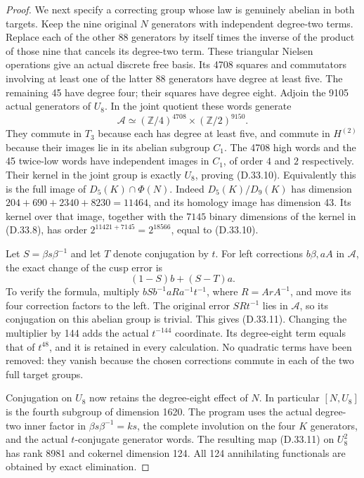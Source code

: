 \begin{proof}
We next specify a correcting group whose law is genuinely abelian in
both targets. Keep the nine original $N$ generators with independent
degree-two terms. Replace each of the other 88 generators by itself
times the inverse of the product of those nine that cancels its
degree-two term. These triangular Nielsen operations give an actual
discrete free basis. Its 4708 squares and commutators involving at least
one of the latter 88 generators have degree at least five. The remaining
45 have degree four; their squares have degree eight. Adjoin the 9105
actual generators of $U_8$. In the joint quotient these words generate
\[
       \mathcal A\simeq(\mathbb Z/4)^{4708}
                         \times(\mathbb Z/2)^{9150}.   \tag{D.33.10}
\]
They commute in $T_3$ because each has degree at least five, and commute
in $H^{(2)}$ because their images lie in its abelian subgroup $C_1$.
The 4708 high words and the 45 twice-low words have independent images
in $C_1$, of order $4$ and $2$ respectively. Their kernel in the joint
group is exactly $U_8$, proving (D.33.10). Equivalently this is the full
image of $D_5(K)\cap\Phi(N)$. Indeed $D_5(K)/D_9(K)$ has dimension
$204+690+2340+8230=11464$, and its homology image has dimension 43.
Its kernel over that image, together with the $7145$ binary dimensions
of the kernel in (D.33.8), has order
$2^{11421+7145}=2^{18566}$, equal to (D.33.10).

Let $S=\beta s\beta^{-1}$ and let $T$ denote conjugation by $t$.
For left corrections $b\beta,aA$ in $\mathcal A$, the exact change of
the cusp error is
\[
                         (1-S)b+(S-T)a.               \tag{D.33.11}
\]
To verify the formula, multiply $bSb^{-1}aRa^{-1}t^{-1}$, where
$R=ArA^{-1}$, and move its four correction factors to the left.
The original error $SRt^{-1}$ lies in $\mathcal A$, so its conjugation
on this abelian group is trivial. This gives (D.33.11). Changing the
multiplier by 144 adds the actual $t^{-144}$ coordinate. Its degree-eight
term equals that of $t^{48}$, and it is retained in every calculation.
No quadratic terms have been removed: they vanish because the chosen
corrections commute in each of the two full target groups.

Conjugation on $U_8$ now retains the degree-eight effect of $N$.
In particular $[N,U_8]$ is the fourth subgroup of dimension 1620.
The program uses the actual degree-two inner factor in
$\beta s\beta^{-1}=ks$, the complete involution on the four $K$
generators, and the actual $t$-conjugate generator words. The resulting
map (D.33.11) on $U_8^2$ has rank 8981 and cokernel dimension 124.
All 124 annihilating functionals are obtained by exact elimination.


\end{proof}
